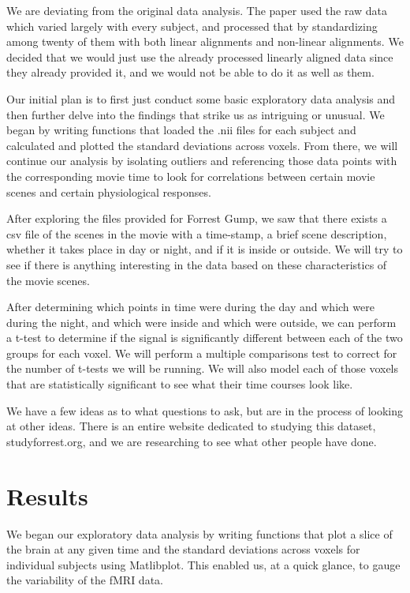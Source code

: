 \documentclass[11pt]{article}
\begin{document}
We are deviating from the original data analysis. The paper used the raw data
which varied largely with every subject, and processed that by standardizing
among twenty of them with both linear alignments and non-linear alignments. We
decided that we would just use the already processed linearly aligned data
since they already provided it, and we would not be able to do it as well as
them.

Our initial plan is to first just conduct some basic exploratory data analysis
and then further delve into the findings that strike us as intriguing or
unusual. We began by writing functions that loaded the .nii files for each
subject and calculated and plotted the standard deviations across voxels. From
there, we will continue our analysis by isolating outliers and referencing
those data points with the corresponding movie time to look for correlations
between certain movie scenes and certain physiological responses.

After exploring the files provided for Forrest Gump, we saw that there exists
a csv file of the scenes in the movie with a time-stamp, a brief scene
description, whether it takes place in day or night, and if it is inside or
outside. We will try to see if there is anything interesting in the data based
on these characteristics of the movie scenes.

After determining which points in time were during the day and which were
during the night, and which were inside and which were outside, we can perform
a t-test to determine if the signal is significantly different between each of
the two groups for each voxel.  We will perform a multiple comparisons test to
correct for the number of t-tests we will be running.   We will also model
each of those voxels that are statistically significant to see what their time
courses look like.

We have a few ideas as to what questions to ask, but are in the process of
looking at other ideas.  There is an entire website dedicated to studying this
dataset, studyforrest.org, and we are researching to see what other people
have done.


\section{Results}

We began our exploratory data analysis by writing functions
that plot a slice of the brain at any given time and the standard deviations
across voxels for individual subjects using Matlibplot. This enabled us, at a
quick glance, to gauge the variability of the fMRI data.
\end{document}

